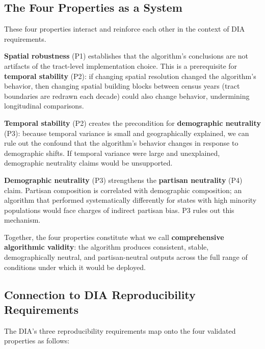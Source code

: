 \subsection{The Four Properties as a System}

These four properties interact and reinforce each other in the context
of DIA requirements.

\textbf{Spatial robustness} (P1) establishes that the algorithm's
conclusions are not artifacts of the tract-level implementation choice.
This is a prerequisite for \textbf{temporal stability} (P2): if
changing spatial resolution changed the algorithm's behavior, then
changing spatial building blocks between census years (tract boundaries
are redrawn each decade) could also change behavior, undermining
longitudinal comparisons.

\textbf{Temporal stability} (P2) creates the precondition for
\textbf{demographic neutrality} (P3): because temporal variance is
small and geographically explained, we can rule out the confound that
the algorithm's behavior changes in response to demographic shifts.
If temporal variance were large and unexplained, demographic neutrality
claims would be unsupported.

\textbf{Demographic neutrality} (P3) strengthens the \textbf{partisan
neutrality} (P4) claim. Partisan composition is correlated with
demographic composition; an algorithm that performed systematically
differently for states with high minority populations would face
charges of indirect partisan bias. P3 rules out this mechanism.

Together, the four properties constitute what we call
\textbf{comprehensive algorithmic validity}: the algorithm produces
consistent, stable, demographically neutral, and partisan-neutral
outputs across the full range of conditions under which it would be
deployed.

\subsection{Connection to DIA Reproducibility Requirements}

The DIA's three reproducibility requirements map onto the four
validated properties as follows:

